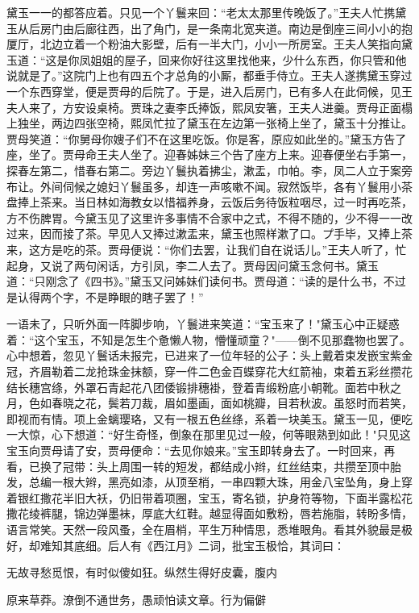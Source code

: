 黛玉一一的都答应着。只见一个丫鬟来回：“老太太那里传晚饭了。”王夫人忙携黛玉从后房门由后廊往西，出了角门，是一条南北宽夹道。南边是倒座三间小小的抱厦厅，北边立着一个粉油大影壁，后有一半大门，小小一所房室。王夫人笑指向黛玉道：“这是你凤姐姐的屋子，回来你好往这里找他来，少什么东西，你只管和他说就是了。”这院门上也有四五个才总角的小厮，都垂手侍立。王夫人遂携黛玉穿过一个东西穿堂，便是贾母的后院了。于是，进入后房门，已有多人在此伺候，见王夫人来了，方安设桌椅。贾珠之妻李氏捧饭，熙凤安箸，王夫人进羹。贾母正面榻上独坐，两边四张空椅，熙凤忙拉了黛玉在左边第一张椅上坐了，黛玉十分推让。贾母笑道：“你舅母你嫂子们不在这里吃饭。你是客，原应如此坐的。”黛玉方告了座，坐了。贾母命王夫人坐了。迎春姊妹三个告了座方上来。迎春便坐右手第一，探春左第二，惜春右第二。旁边丫鬟执着拂尘，漱盂，巾帕。李，凤二人立于案旁布让。外间伺候之媳妇丫鬟虽多，却连一声咳嗽不闻。寂然饭毕，各有丫鬟用小茶盘捧上茶来。当日林如海教女以惜福养身，云饭后务待饭粒咽尽，过一时再吃茶，方不伤脾胃。今黛玉见了这里许多事情不合家中之式，不得不随的，少不得一一改过来，因而接了茶。早见人又捧过漱盂来，黛玉也照样漱了口。プ手毕，又捧上茶来，这方是吃的茶。贾母便说：“你们去罢，让我们自在说话儿。”王夫人听了，忙起身，又说了两句闲话，方引凤，李二人去了。贾母因问黛玉念何书。黛玉道：“只刚念了《四书》。”黛玉又问姊妹们读何书。贾母道：“读的是什么书，不过是认得两个字，不是睁眼的瞎子罢了！”

一语未了，只听外面一阵脚步响，丫鬟进来笑道：“宝玉来了！"黛玉心中正疑惑着：“这个宝玉，不知是怎生个惫懒人物，懵懂顽童？"——倒不见那蠢物也罢了。心中想着，忽见丫鬟话未报完，已进来了一位年轻的公子：头上戴着束发嵌宝紫金冠，齐眉勒着二龙抢珠金抹额，穿一件二色金百蝶穿花大红箭袖，束着五彩丝攒花结长穗宫绦，外罩石青起花八团倭锻排穗褂，登着青缎粉底小朝靴。面若中秋之月，色如春晓之花，鬓若刀裁，眉如墨画，面如桃瓣，目若秋波。虽怒时而若笑，即视而有情。项上金螭璎珞，又有一根五色丝绦，系着一块美玉。黛玉一见，便吃一大惊，心下想道：“好生奇怪，倒象在那里见过一般，何等眼熟到如此！"只见这宝玉向贾母请了安，贾母便命：“去见你娘来。”宝玉即转身去了。一时回来，再看，已换了冠带：头上周围一转的短发，都结成小辫，红丝结束，共攒至顶中胎发，总编一根大辫，黑亮如漆，从顶至梢，一串四颗大珠，用金八宝坠角，身上穿着银红撒花半旧大袄，仍旧带着项圈，宝玉，寄名锁，护身符等物，下面半露松花撒花绫裤腿，锦边弹墨袜，厚底大红鞋。越显得面如敷粉，唇若施脂，转盼多情，语言常笑。天然一段风蚤，全在眉梢，平生万种情思，悉堆眼角。看其外貌最是极好，却难知其底细。后人有《西江月》二词，批宝玉极恰，其词曰：

无故寻愁觅恨，有时似傻如狂。纵然生得好皮囊，腹内

原来草莽。潦倒不通世务，愚顽怕读文章。行为偏僻

